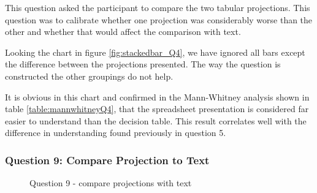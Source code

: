 This question asked the participant to compare the two tabular projections.  
This question was to calibrate whether one projection was considerably worse than the other and whether that would affect the comparison with text.

Looking the chart in figure \ref{fig:stackedbar_Q4}, we have ignored all bars except the difference between the projections presented.
The way the question is constructed the other groupings do not help.

It is obvious in this chart and confirmed in the Mann-Whitney analysis shown in table \ref{table:mannwhitneyQ4}, that the spreadsheet presentation is considered far easier to understand than the decision table.
This result correlates well with the difference in understanding found previously in question 5.

\subsubsection{Question 9: Compare Projection to Text}

\begin{figure}[H]
    \centering
    \caption{Question 9 - compare projections with text}
    \label{fig:stackedbar_Q5}
\end{figure}

